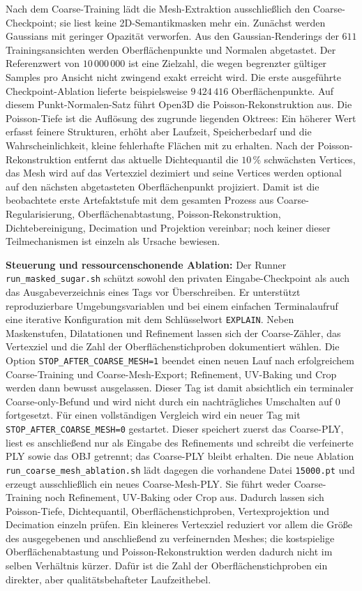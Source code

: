 \documentclass[12pt,a4paper]{article}
\begin{document}
Nach dem Coarse-Training lädt die Mesh-Extraktion ausschließlich den Coarse-Checkpoint; sie liest keine 2D-Semantikmasken mehr ein. Zunächst werden Gaussians mit geringer Opazität verworfen. Aus den Gaussian-Renderings der $611$ Trainingsansichten werden Oberflächenpunkte und Normalen abgetastet. Der Referenzwert von $10\,000\,000$ ist eine Zielzahl, die wegen begrenzter gültiger Samples pro Ansicht nicht zwingend exakt erreicht wird. Die erste ausgeführte Checkpoint-Ablation lieferte beispielsweise $9\,424\,416$ Oberflächenpunkte. Auf diesem Punkt-Normalen-Satz führt Open3D die Poisson-Rekonstruktion aus. Die Poisson-Tiefe ist die Auflösung des zugrunde liegenden Oktrees: Ein höherer Wert erfasst feinere Strukturen, erhöht aber Laufzeit, Speicherbedarf und die Wahrscheinlichkeit, kleine fehlerhafte Flächen mit zu erhalten. Nach der Poisson-Rekonstruktion entfernt das aktuelle Dichtequantil die $10\,\%$ schwächsten Vertices, das Mesh wird auf das Vertexziel dezimiert und seine Vertices werden optional auf den nächsten abgetasteten Oberflächenpunkt projiziert. Damit ist die beobachtete erste Artefaktstufe mit dem gesamten Prozess aus Coarse-Regularisierung, Oberflächenabtastung, Poisson-Rekonstruktion, Dichtebereinigung, Decimation und Projektion vereinbar; noch keiner dieser Teilmechanismen ist einzeln als Ursache bewiesen.

\textbf{Steuerung und ressourcenschonende Ablation:} Der Runner \texttt{run\_masked\_sugar.sh} schützt sowohl den privaten Eingabe-Checkpoint als auch das Ausgabeverzeichnis eines Tags vor Überschreiben. Er unterstützt reproduzierbare Umgebungsvariablen und bei einem einfachen Terminalaufruf eine iterative Konfiguration mit dem Schlüsselwort \texttt{EXPLAIN}. Neben Maskenstufen, Dilatationen und Refinement lassen sich der Coarse-Zähler, das Vertexziel und die Zahl der Oberflächenstichproben dokumentiert wählen. Die Option \texttt{STOP\_AFTER\_COARSE\_MESH=1} beendet einen neuen Lauf nach erfolgreichem Coarse-Training und Coarse-Mesh-Export; Refinement, UV-Baking und Crop werden dann bewusst ausgelassen. Dieser Tag ist damit absichtlich ein terminaler Coarse-only-Befund und wird nicht durch ein nachträgliches Umschalten auf $0$ fortgesetzt. Für einen vollständigen Vergleich wird ein neuer Tag mit \texttt{STOP\_AFTER\_COARSE\_MESH=0} gestartet. Dieser speichert zuerst das Coarse-PLY, liest es anschließend nur als Eingabe des Refinements und schreibt die verfeinerte PLY sowie das OBJ getrennt; das Coarse-PLY bleibt erhalten. Die neue Ablation \texttt{run\_coarse\_mesh\_ablation.sh} lädt dagegen die vorhandene Datei \texttt{15000.pt} und erzeugt ausschließlich ein neues Coarse-Mesh-PLY. Sie führt weder Coarse-Training noch Refinement, UV-Baking oder Crop aus. Dadurch lassen sich Poisson-Tiefe, Dichtequantil, Oberflächenstichproben, Vertexprojektion und Decimation einzeln prüfen. Ein kleineres Vertexziel reduziert vor allem die Größe des ausgegebenen und anschließend zu verfeinernden Meshes; die kostspielige Oberflächenabtastung und Poisson-Rekonstruktion werden dadurch nicht im selben Verhältnis kürzer. Dafür ist die Zahl der Oberflächenstichproben ein direkter, aber qualitätsbehafteter Laufzeithebel.
\end{document}

